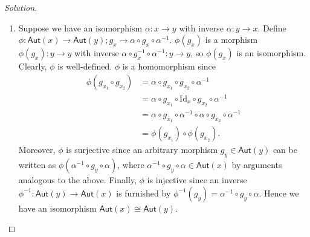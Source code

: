 \begin{proof}[Solution]
\begin{enumerate}[font=\normalfont,label=\textbf{(\alph*)}, wide]
\item Suppose we have an isomorphism $\alpha: x \to y$ with inverse $\alpha: y \to x$. Define $\phi: \mathsf{Aut}(x) \to \mathsf{Aut}(y); g_x \to \alpha \circ g_x \circ \alpha^{-1}$. $\phi(g_x)$ is a morphism $\phi(g_x): y\to y$ with inverse $\alpha \circ g_x^{-1} \circ \alpha^{-1} : y \to y$, so $\phi(g_x)$ is an isomorphism. Clearly, $\phi$ is well-defined. $\phi$ is a homomorphism since 
\[
\begin{aligned}
\phi(g_{x_1}\circ g_{x_2}) &= \alpha \circ g_{x_1}\circ g_{x_2} \circ \alpha^{-1} \\
&= \alpha \circ g_{x_1} \circ \text{Id}_x \circ g_{x_2} \circ \alpha^{-1} \\
&= \alpha \circ g_{x_1} \circ \alpha^{-1} \circ \alpha \circ g_{x_2} \circ \alpha^{-1} \\
&= \phi(g_{x_1})\circ \phi(g_{x_2}).
\end{aligned}
\]
Moreover, $\phi$ is surjective since an arbitrary morphism $g_y \in \mathsf{Aut}(y)$ can be written as $\phi(\alpha^{-1} \circ g_y \circ \alpha)$, where $\alpha^{-1} \circ g_y \circ \alpha \in \mathsf{Aut}(x)$ by arguments analogous to the above. Finally, $\phi$ is injective since an inverse $\phi^{-1}: \mathsf{Aut}(y) \to \mathsf{Aut}(x)$ is furnished by $\phi^{-1}(g_y) = \alpha^{-1} \circ g_y \circ \alpha$. Hence we have an isomorphism $\mathsf{Aut}(x) \cong \mathsf{Aut}(y)$. 
\end{enumerate}
\end{proof}




